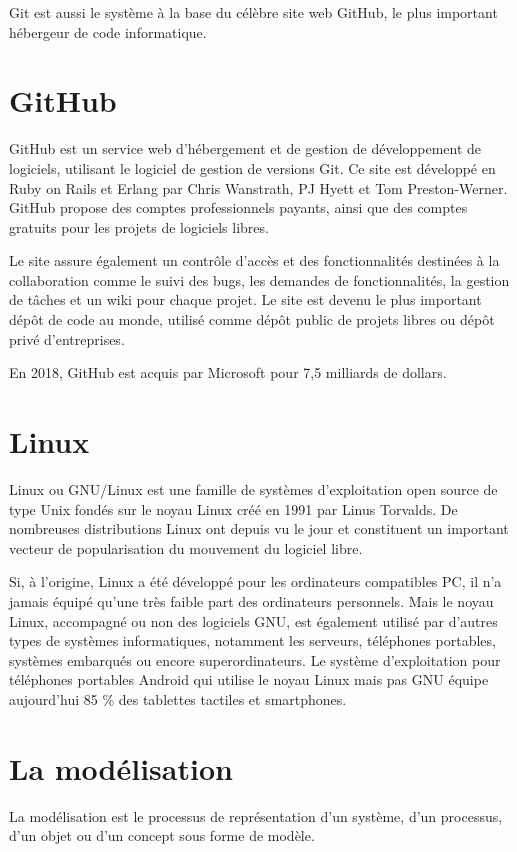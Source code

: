 Git est aussi le système à la base du célèbre site web GitHub,
le plus important hébergeur de code informatique.

\section{GitHub}\label{sec:github-1}
GitHub\cite{github} est un service web d'hébergement et de gestion de développement de logiciels,
utilisant le logiciel de gestion de versions Git.
Ce site est développé en Ruby on Rails et Erlang par Chris Wanstrath, PJ Hyett et
Tom Preston-Werner. GitHub propose des comptes professionnels payants,
ainsi que des comptes gratuits pour les projets de logiciels libres.

Le site assure également un contrôle d'accès et des fonctionnalités destinées à
la collaboration comme le suivi des bugs, les demandes de fonctionnalités, la gestion
de tâches et un wiki pour chaque projet. Le site est devenu le plus important dépôt de
code au monde, utilisé comme dépôt public de projets libres ou dépôt privé d'entreprises.

En 2018, GitHub est acquis par Microsoft pour 7,5 milliards de dollars.

\section{Linux}\label{sec:linux}
Linux\cite{linux} ou GNU/Linux est une famille de systèmes d'exploitation open source de type
Unix fondés sur le noyau Linux créé en 1991 par Linus Torvalds. De nombreuses distributions
Linux ont depuis vu le jour et constituent un important vecteur de popularisation du mouvement
du logiciel libre.

Si, à l'origine, Linux a été développé pour les ordinateurs compatibles PC, il n'a jamais équipé
qu'une très faible part des ordinateurs personnels. Mais le noyau Linux, accompagné ou non des logiciels
GNU, est également utilisé par d'autres types de systèmes informatiques, notamment les serveurs,
téléphones portables, systèmes embarqués ou encore superordinateurs. Le système d'exploitation pour
téléphones portables Android qui utilise le noyau Linux mais pas GNU équipe aujourd'hui
85 \% des tablettes tactiles et smartphones.

\section{La modélisation}\label{sec:modelisation}
La modélisation est le processus de représentation d'un système,
d'un processus, d'un objet ou d'un concept sous forme de modèle.

